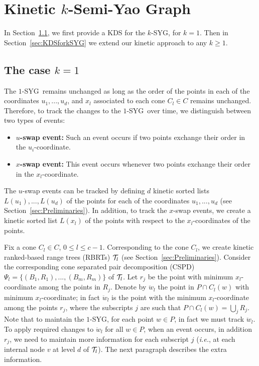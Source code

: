\documentclass[preprint,12pt]{elsarticle}
\def\ksyg{\mbox{$k$-SYG}}
\def\1syg{\mbox{$1$-SYG}}
\newcommand{\ie}{\emph{i.e.}}
\begin{document}
\section{Kinetic $k$-Semi-Yao Graph}\label{sec:kineticKSYG}
In Section~\ref{sec:KDSfor1SYG}, we first provide a KDS for the \ksyg, for $k=1$. Then in Section~\ref{sec:KDSforkSYG} we extend our kinetic approach to any $k\geq 1$.

\subsection{The case $k=1$}\label{sec:KDSfor1SYG}


The \1syg~remains unchanged as long as the order of the points in each of the coordinates $u_1,...,u_d$, and $x_l$ associated to each cone $C_l\in C$ remains unchanged. Therefore, to track the changes to the \1syg~over time, we distinguish between two types of events:

\begin{itemize}
\item \textbf{$u$-swap event:} Such an event occurs if two points exchange their order in the $u_i$-coordinate. 
\item \textbf{$x$-swap event:} This event occurs whenever two points exchange their order in the $x_l$-coordinate. 
\end{itemize}

The $u$-swap events can be tracked by defining $d$ kinetic sorted lists $L(u_1),...,L(u_d)$ of the points for each of the coordinates $u_1,...,u_d$ (see Section~\ref{sec:Preliminaries}). In addition, to track the $x$-swap events, we create a kinetic sorted list $L(x_l)$ of the points with respect to the $x_l$-coordinates of the points.

Fix a cone $C_l\in C$, $0\leq l\leq c-1$. Corresponding to the cone $C_l$, we create kinetic ranked-based range trees (RBRTs) ${\cal T}_l$ (see Section~\ref{sec:Preliminaries}). Consider the corresponding cone separated pair decomposition (CSPD) $\Psi_l=\{(B_1,R_1),...,(B_m,R_m)\}$ of ${\cal T}_l$. Let $r_j$ be the point with minimum $x_l$-coordinate among the points in $R_j$. Denote by $\ddot{w}_l$ the point in $P\cap C_l(w)$ with minimum $x_l$-coordinate; in fact $\ddot{w}_l$ is the point with the minimum $x_l$-coordinate among the points $r_j$, where the subscripts $j$ are such that $P\cap C_l(w)=\bigcup_j R_j$. Note that to maintain the \1syg, for each point $w\in P$, in fact we must track $\ddot{w}_l$.
To apply required changes to $\ddot{w}_l$ for all $w\in P$, when an event occurs, in addition $r_j$, we need to maintain more information for each subscript $j$ (\ie, at each internal node $v$ at level $d$ of ${\cal T}_l$). The next paragraph describes the extra information.
\end{document}
